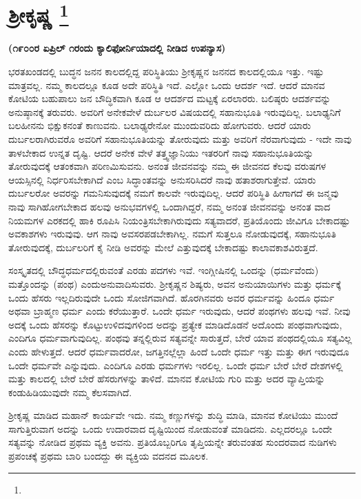 
\chapter[ಶ‍್ರೀಕೃಷ್ಣ ]{ಶ‍್ರೀಕೃಷ್ಣ \protect\footnote{}}

\centerline{\textbf{(೧೯೦೦ರ ಏಪ್ರಿಲ್​ ೧ರಂದು ಕ್ಯಾಲಿಫೋರ್ನಿಯಾದಲ್ಲಿ ನೀಡಿದ ಉಪನ್ಯಾಸ)}}

ಭರತಖಂಡದಲ್ಲಿ ಬುದ್ಧನ ಜನನ ಕಾಲದಲ್ಲಿದ್ದ ಪರಿಸ್ಥಿತಿಯು ಶ‍್ರೀಕೃಷ್ಣನ ಜನನದ ಕಾಲದಲ್ಲಿಯೂ ಇತ್ತು. ಇಷ್ಟು ಮಾತ್ರವಲ್ಲ. ನಮ್ಮ ಕಾಲದಲ್ಲೂ ಕೂಡ ಅದೇ ಪರಿಸ್ಥಿತಿ ಇದೆ. ಎಲ್ಲೋ ಒಂದು ಆದರ್ಶ ಇದೆ. ಆದರೆ ಮಾನವ ಕೋಟಿಯ ಬಹುಪಾಲು ಜನ ಬೌದ್ಧಿಕವಾಗಿ ಕೂಡ ಆ ಆದರ್ಶದ ಮಟ್ಟಕ್ಕೆ ಏರಲಾರರು. ಬಲಿಷ್ಠರು ಆದರ್ಶವನ್ನು ಅನುಷ್ಠಾನಕ್ಕೆ ತರುವರು. ಅವರಿಗೆ ಅನೇಕವೇಳೆ ದುರ್ಬಲರ ವಿಷಯದಲ್ಲಿ ಸಹಾನುಭೂತಿ ಇರುವುದಿಲ್ಲ. ಬಲಾಢ್ಯನಿಗೆ ಬಲಹೀನನು ಭಿಕ್ಷುಕನಂತೆ ಕಾಣುವನು. ಬಲಾಢ್ಯರೇನೋ ಮುಂದುವರಿದು ಹೋಗುವರು. ಆದರೆ ಯಾರು ದುರ್ಬಲರಾಗಿರುವರೊ ಅವರಿಗೆ ಸಹಾನುಭೂತಿಯನ್ನು ತೋರುವುದು ಮತ್ತು ಅವರಿಗೆ ನೆರವಾಗುವುದು - ಇದೇ ನಾವು ತಾಳಬೇಕಾದ ಉನ್ನತ ದೃಷ್ಟಿ. ಆದರೆ ಅನೇಕ ವೇಳೆ ತತ್ತ್ವಜ್ಞಾನಿಯು ಇತರರಿಗೆ ನಾವು ಸಹಾನುಭೂತಿಯನ್ನು ತೋರುವುದಕ್ಕೆ ಆತಂಕವಾಗಿ ಪರಿಣಮಿಸುವನು. ಅನಂತ ಜೀವನವನ್ನು ನಮ್ಮ ಈ ಜೀವನದ ಕೆಲವು ವರುಷಗಳ ಆಯಸ್ಸಿನಲ್ಲಿ ನಿರ್ಧರಿಸಬೇಕಾಗಿದೆ ಎಂಬ ಸಿದ್ಧಾಂತವನ್ನು ಅನುಸರಿಸಿದರೆ ನಾವು ಹತಾಶರಾಗುತ್ತೇವೆ. ಯಾರು ದುರ್ಬಲರೋ ಅವರನ್ನು ಗಮನಿಸುವುದಕ್ಕೆ ನಮಗೆ ಕಾಲವೇ ಇರುವುದಿಲ್ಲ. ಆದರೆ ಪರಿಸ್ಥಿತಿ ಹೀಗಾಗದೆ ಈ ಜನ್ಮವು ನಾವು ಸಾಗಿಹೋಗಬೇಕಾದ ಹಲವು ಅನುಭವಗಳಲ್ಲಿ ಒಂದಾಗಿದ್ದರೆ, ನಮ್ಮ ಅನಂತ ಜೀವನವನ್ನು ಅನಂತ ವಾದ ನಿಯಮಗಳ ಎರಕದಲ್ಲಿ ಹಾಕಿ ರೂಪಿಸಿ ನಿಯಂತ್ರಿಸಬೇಕಾಗಿರುವುದು ಸತ್ಯವಾದರೆ, ಪ್ರತಿಯೊಂದು ಜೀವಿಗೂ ಬೇಕಾದಷ್ಟು ಅವಕಾಶಗಳು ಇರುವುವು. ಆಗ ನಾವು ಅವಸರಪಡಬೇಕಾಗಿಲ್ಲ. ನಮಗೆ ಸುತ್ತಲೂ ನೋಡುವುದಕ್ಕೆ, ಸಹಾನುಭೂತಿ ತೋರುವುದಕ್ಕೆ, ದುರ್ಬಲರಿಗೆ ಕೈ ನೀಡಿ ಅವರನ್ನು ಮೇಲೆ ಎತ್ತುವುದಕ್ಕೆ ಬೇಕಾದಷ್ಟು ಕಾಲಾವಕಾಶವಿರುತ್ತದೆ.

ಸಂಸ್ಕೃತದಲ್ಲಿ ಬೌದ್ಧಧರ್ಮದಲ್ಲಿರುವಂತೆ ಎರಡು ಪದಗಳು ಇವೆ. ಇಂಗ್ಲೀಷಿನಲ್ಲಿ ಒಂದನ್ನು  (ಧರ್ಮವೆಂದು) ಮತ್ತೊಂದನ್ನು  (ಪಂಥ) ಎಂದು\break ಅನುವಾದಿಸುವರು. ಶ‍್ರೀಕೃಷ್ಣನ ಶಿಷ್ಯರು, ಅವನ ಅನುಯಾಯಿಗಳು ಮತ್ತು ಧರ್ಮಕ್ಕೆ ಒಂದು ಹೆಸರು ಇಲ್ಲದಿರುವುದೇ ಒಂದು ಸೋಜಿಗವಾಗಿದೆ. ಹೊರಗಿನವರು ಅವರ ಧರ್ಮವನ್ನು ಹಿಂದೂ ಧರ್ಮ ಅಥವಾ ಬ್ರಾಹ್ಮಣ ಧರ್ಮ ಎಂದು ಕರೆಯುತ್ತಾರೆ. ಒಂದೇ ಧರ್ಮ ಇರುವುದು, ಆದರೆ ಪಂಥಗಳು ಹಲವು ಇವೆ. ನೀವು ಅದಕ್ಕೆ ಒಂದು ಹೆಸರನ್ನು ಕೊಟ್ಟು\break ಉಳಿದವುಗಳಿಂದ ಅದನ್ನು ಪ್ರತ್ಯೇಕ ಮಾಡಿದೊಡನೆ ಅದೊಂದು ಪಂಥವಾಗುವುದು, ಎಂದಿಗೂ ಧರ್ಮವಾಗುವುದಿಲ್ಲ. ಪಂಥವು ತನ್ನಲ್ಲಿರುವ ಸತ್ಯವನ್ನೇ ಸಾರುತ್ತದೆ, ಬೇರೆ ಯಾವ ಪಂಥದಲ್ಲಿಯೂ ಸತ್ಯವಿಲ್ಲ ಎಂದು ಹೇಳುತ್ತದೆ. ಆದರೆ ಧರ್ಮವಾದರೋ, ಜಗತ್ತಿನಲ್ಲೆಲ್ಲಾ ಹಿಂದೆ ಒಂದೇ ಧರ್ಮ ಇತ್ತು ಮತ್ತು ಈಗ ಇರುವುದೂ ಒಂದೇ ಧರ್ಮವೇ ಎನ್ನುವುದು. ಎಂದಿಗೂ ಎರಡು ಧರ್ಮಗಳು ಇರಲಿಲ್ಲ. ಒಂದೇ ಧರ್ಮ ಬೇರೆ ಬೇರೆ ದೇಶಗಳಲ್ಲಿ ಮತ್ತು ಕಾಲದಲ್ಲಿ ಬೇರೆ ಬೇರೆ ಹೆಸರುಗಳನ್ನು ತಾಳಿದೆ. ಮಾನವ ಕೋಟಿಯ ಗುರಿ ಮತ್ತು ಅದರ ವ್ಯಾಪ್ತಿಯನ್ನು ಕಂಡುಹಿಡಿಯುವುದೇ ನಮ್ಮ ಕೆಲಸವಾಗಿದೆ.

ಶ‍್ರೀಕೃಷ್ಣ ಮಾಡಿದ ಮಹಾನ್​ ಕಾರ್ಯವೇ ಇದು. ನಮ್ಮ ಕಣ್ಣುಗಳನ್ನು ಶುದ್ಧಿ ಮಾಡಿ, ಮಾನವ ಕೋಟಿಯು ಮುಂದೆ ಸಾಗುತ್ತಿರುವಾಗ ಅದನ್ನು ಒಂದು ಉದಾರವಾದ ದೃಷ್ಟಿಯಿಂದ ನೋಡುವಂತೆ ಮಾಡಿದನು. ಎಲ್ಲದರಲ್ಲೂ ಒಂದೇ ಸತ್ಯವನ್ನು ನೋಡಿದ ಪ್ರಥಮ ವ್ಯಕ್ತಿ ಅವನು. ಪ್ರತಿಯೊಬ್ಬರಿಗೂ ತೃಪ್ತಿಯನ್ನೇ ತರುವಂತಹ ಸುಂದರವಾದ ನುಡಿಗಳು ಪ್ರಪಂಚಕ್ಕೆ ಪ್ರಥಮ ಬಾರಿ ಬಂದದ್ದು ಈ ವ್ಯಕ್ತಿಯ ವದನದ ಮೂಲಕ.

